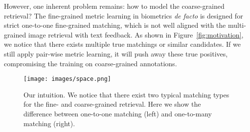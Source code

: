 \documentclass[10pt,twocolumn,letterpaper]{article}
\begin{document}
However, one inherent problem remains: how to model the coarse-grained retrieval? The fine-grained metric learning in biometrics \emph{de facto} is designed for strict one-to-one fine-grained matching, which is not well aligned with the multi-grained image retrieval with text feedback. 
As shown in Figure~\ref{fig:motivation},  we notice that there exists multiple true matchings or similar candidates.  
If we still apply pair-wise metric learning, it will push away these true positives,  compromising the training on coarse-grained annotations.

\begin{figure}[t]
\begin{center}\vspace{-.2in}
     \texttt{[image: images/space.png]}
\end{center} \vspace{-.3in}
      \caption{ Our intuition. We notice that there exist two typical matching types for the fine- and coarse-grained retrieval. Here we show the difference between one-to-one matching (left) and one-to-many matching (right). }
      \label{fig:space}\vspace{-.15in}
\end{figure}
\end{document}
